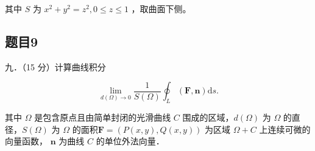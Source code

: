 \documentclass{article}
\begin{document}
其中 \(S\) 为 \(x^{2}+y^{2}=z^{2}, 0 \leq z \leq 1\) ，取曲面下侧。

\subsection{题目9}
九．（15 分）计算曲线积分

\[
\lim _{d(\Omega) \rightarrow 0} \frac{1}{S(\Omega)} \oint_{L}(\mathbf{F}, \mathbf{n}) \mathrm{d} s .
\]

其中 \(\Omega\) 是包含原点且由简单封闭的光滑曲线 \(C\) 围成的区域，\(d(\Omega)\) 为 \(\Omega\) 的直径，\(S(\Omega)\) 为 \(\Omega\) 的面积\(\mathbf{F}=(P(x, y), Q(x, y))\) 为区域 \(\Omega+C\) 上连续可微的向量函数， \(\mathbf{n}\) 为曲线 \(C\) 的单位外法向量．

\end{document}
